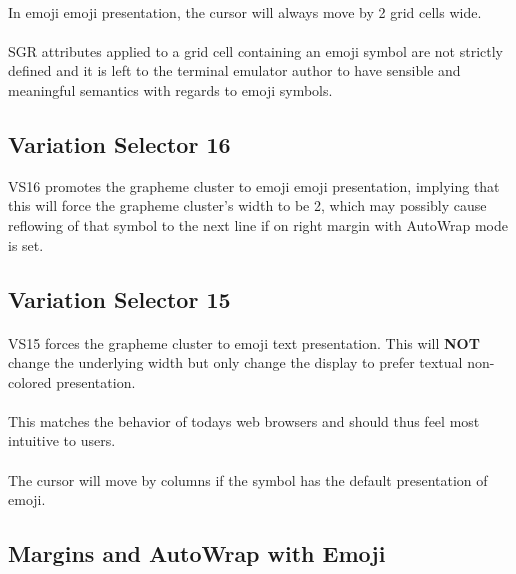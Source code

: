 \documentclass{article}
\begin{document}
\paragraph*{}
In emoji emoji presentation, the cursor will always move by 2 grid cells wide.

\paragraph*{}
SGR attributes applied to a grid cell containing an emoji symbol are
not strictly defined and it is left to the terminal emulator author to have
sensible and meaningful semantics with regards to emoji symbols.

\subsection{Variation Selector 16}

VS16 promotes the grapheme cluster to emoji emoji presentation,
implying that this will force the grapheme cluster's width to be 2,
which may possibly cause reflowing of that symbol to the next line
if on right margin with AutoWrap mode is set.

\subsection{Variation Selector 15}

\paragraph*{}
VS15 forces the grapheme cluster to emoji text presentation.
This will \textbf{NOT} change the underlying width
but only change the display to prefer textual non-colored presentation.

\paragraph*{}
This matches the behavior of todays web browsers and should thus
feel most intuitive to users.

\paragraph*{}
The cursor will move by columns if the symbol has the default presentation of emoji.

\subsection{Margins and AutoWrap with Emoji}
\end{document}
